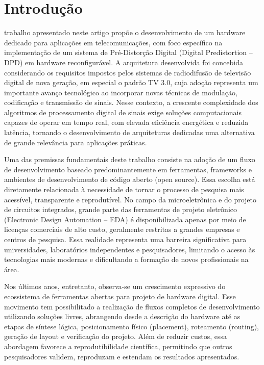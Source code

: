 \documentclass[journal,comsoc]{IEEEtran}
\begin{document}
\section{Introdução}
 trabalho apresentado neste artigo propõe o desenvolvimento de um hardware dedicado para aplicações em telecomunicações, com foco específico na implementação de um sistema de Pré-Distorção Digital (Digital Predistortion – DPD) em hardware reconfigurável. A arquitetura desenvolvida foi concebida considerando os requisitos impostos pelos sistemas de radiodifusão de televisão digital de nova geração, em especial o padrão TV 3.0, cuja adoção representa um importante avanço tecnológico ao incorporar novas técnicas de modulação, codificação e transmissão de sinais. Nesse contexto, a crescente complexidade dos algoritmos de processamento digital de sinais exige soluções computacionais capazes de operar em tempo real, com elevada eficiência energética e reduzida latência, tornando o desenvolvimento de arquiteturas dedicadas uma alternativa de grande relevância para aplicações práticas.

Uma das premissas fundamentais deste trabalho consiste na adoção de um fluxo de desenvolvimento baseado predominantemente em ferramentas, frameworks e ambientes de desenvolvimento de código aberto (open source). Essa escolha está diretamente relacionada à necessidade de tornar o processo de pesquisa mais acessível, transparente e reprodutível. No campo da microeletrônica e do projeto de circuitos integrados, grande parte das ferramentas de projeto eletrônico (Electronic Design Automation – EDA) é disponibilizada apenas por meio de licenças comerciais de alto custo, geralmente restritas a grandes empresas e centros de pesquisa. Essa realidade representa uma barreira significativa para universidades, laboratórios independentes e pesquisadores, limitando o acesso às tecnologias mais modernas e dificultando a formação de novos profissionais na área.

Nos últimos anos, entretanto, observa-se um crescimento expressivo do ecossistema de ferramentas abertas para projeto de hardware digital. Esse movimento tem possibilitado a realização de fluxos completos de desenvolvimento utilizando soluções livres, abrangendo desde a descrição do hardware até as etapas de síntese lógica, posicionamento físico (placement), roteamento (routing), geração de layout e verificação do projeto. Além de reduzir custos, essa abordagem favorece a reprodutibilidade científica, permitindo que outros pesquisadores validem, reproduzam e estendam os resultados apresentados.
\end{document}
